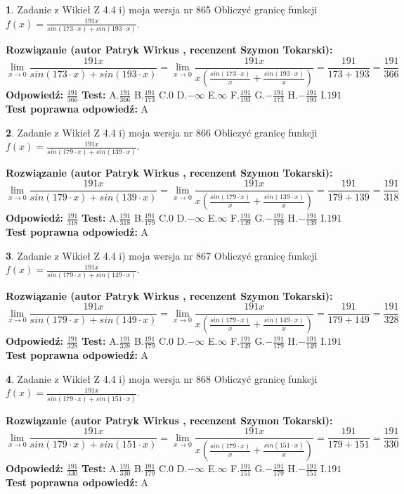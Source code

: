 \documentclass[12pt, a4paper]{article}
\theoremstyle{definition} %
\newtheorem{zad}{}
\newcommand{\zadStart}[1]{\begin{zad}#1\newline}
\newcommand{\zadStop}{\end{zad}}
\newcommand{\rozwStart}[2]{\noindent \textbf{Rozwiązanie (autor #1 , recenzent #2): }\newline}
\newcommand{\rozwStop}{\newline}
\newcommand{\odpStart}{\noindent \textbf{Odpowiedź:}\newline}
\newcommand{\odpStop}{\newline}
\newcommand{\testStart}{\noindent \textbf{Test:}\newline}
\newcommand{\testStop}{\newline}
\newcommand{\kluczStart}{\noindent \textbf{Test poprawna odpowiedź:}\newline}
\newcommand{\kluczStop}{\newline}
\begin{document}
\zadStart{Zadanie z Wikieł Z 4.4 i) moja wersja nr 865}
Obliczyć granicę funkcji $f(x)=\frac{191x}{sin(173\cdot x) +sin(193\cdot x)}$.
\zadStop
\rozwStart{Patryk Wirkus}{Szymon Tokarski}
$$\lim\limits_{x\to 0}\frac{191x}{sin(173\cdot x) +sin(193\cdot x)}=\lim\limits_{x\to 0}\frac{191x}{x(\frac{sin(173\cdot x)}{x}+\frac{sin(193\cdot x)}{x})}=\frac{191}{173+193} = \frac{191}{366}$$
\rozwStop
\odpStart
$\frac{191}{366}$
\odpStop
\testStart
A.$\frac{191}{366}$
B.$\frac{191}{173}$
C.$0$
D.$-\infty$
E.$\infty$
F.$\frac{191}{193}$
G.$-\frac{191}{173}$
H.$-\frac{191}{193}$
I.$191$
\testStop
\kluczStart
A
\kluczStop



\zadStart{Zadanie z Wikieł Z 4.4 i) moja wersja nr 866}
Obliczyć granicę funkcji $f(x)=\frac{191x}{sin(179\cdot x) +sin(139\cdot x)}$.
\zadStop
\rozwStart{Patryk Wirkus}{Szymon Tokarski}
$$\lim\limits_{x\to 0}\frac{191x}{sin(179\cdot x) +sin(139\cdot x)}=\lim\limits_{x\to 0}\frac{191x}{x(\frac{sin(179\cdot x)}{x}+\frac{sin(139\cdot x)}{x})}=\frac{191}{179+139} = \frac{191}{318}$$
\rozwStop
\odpStart
$\frac{191}{318}$
\odpStop
\testStart
A.$\frac{191}{318}$
B.$\frac{191}{179}$
C.$0$
D.$-\infty$
E.$\infty$
F.$\frac{191}{139}$
G.$-\frac{191}{179}$
H.$-\frac{191}{139}$
I.$191$
\testStop
\kluczStart
A
\kluczStop



\zadStart{Zadanie z Wikieł Z 4.4 i) moja wersja nr 867}
Obliczyć granicę funkcji $f(x)=\frac{191x}{sin(179\cdot x) +sin(149\cdot x)}$.
\zadStop
\rozwStart{Patryk Wirkus}{Szymon Tokarski}
$$\lim\limits_{x\to 0}\frac{191x}{sin(179\cdot x) +sin(149\cdot x)}=\lim\limits_{x\to 0}\frac{191x}{x(\frac{sin(179\cdot x)}{x}+\frac{sin(149\cdot x)}{x})}=\frac{191}{179+149} = \frac{191}{328}$$
\rozwStop
\odpStart
$\frac{191}{328}$
\odpStop
\testStart
A.$\frac{191}{328}$
B.$\frac{191}{179}$
C.$0$
D.$-\infty$
E.$\infty$
F.$\frac{191}{149}$
G.$-\frac{191}{179}$
H.$-\frac{191}{149}$
I.$191$
\testStop
\kluczStart
A
\kluczStop



\zadStart{Zadanie z Wikieł Z 4.4 i) moja wersja nr 868}
Obliczyć granicę funkcji $f(x)=\frac{191x}{sin(179\cdot x) +sin(151\cdot x)}$.
\zadStop
\rozwStart{Patryk Wirkus}{Szymon Tokarski}
$$\lim\limits_{x\to 0}\frac{191x}{sin(179\cdot x) +sin(151\cdot x)}=\lim\limits_{x\to 0}\frac{191x}{x(\frac{sin(179\cdot x)}{x}+\frac{sin(151\cdot x)}{x})}=\frac{191}{179+151} = \frac{191}{330}$$
\rozwStop
\odpStart
$\frac{191}{330}$
\odpStop
\testStart
A.$\frac{191}{330}$
B.$\frac{191}{179}$
C.$0$
D.$-\infty$
E.$\infty$
F.$\frac{191}{151}$
G.$-\frac{191}{179}$
H.$-\frac{191}{151}$
I.$191$
\testStop
\kluczStart
A
\kluczStop
\end{document}
